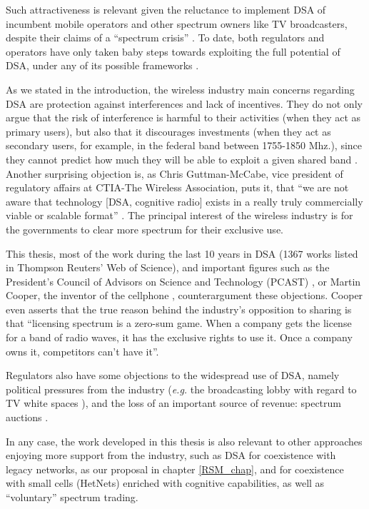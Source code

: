 Such attractiveness is relevant given the reluctance to implement DSA of incumbent mobile operators and other spectrum owners like TV broadcasters, despite their claims of a \enquote{spectrum crisis} \cite{Chen2012b}. To date, both regulators and operators have only taken baby steps towards exploiting the full potential of DSA, under any of its possible frameworks \cite{Nuechterlein2013, Kelly2012}.

As we stated in the introduction, the wireless industry main concerns regarding DSA are protection against interferences and lack of incentives. They do not only argue that the risk of interference is harmful to their activities (when they act as primary users), but also that it discourages investments (when they act as secondary users, for example, in the federal band between 1755-1850 Mhz.), since they cannot predict how much they will be able to exploit a given shared band \cite{CTIA2011}.  Another surprising objection is, as Chris Guttman-McCabe, vice president of regulatory affairs at CTIA-The Wireless Association, puts it, that \enquote{we are not aware that technology [DSA, cognitive radio] exists in a really truly commercially viable or scalable format} \cite{Chen2012}. The principal interest of the wireless industry is for the governments to clear more spectrum for their exclusive use\cite{Roche2015,Chen2012}. 

This thesis, most of the work during the last 10 years in DSA (1367 works listed in Thompson Reuters' Web of Science), and important figures such as the President’s Council of Advisors on Science and Technology (PCAST) \cite{AdvisorsonScience}, or Martin Cooper, the inventor of the cellphone \cite{Chen2012b,Br2012}, counterargument these objections. Cooper even asserts that the true reason behind the industry's opposition to sharing is that \enquote{licensing spectrum is a zero-sum game. When a company gets the license for a band of radio waves, it has the exclusive rights to use it. Once a company owns it, competitors can't have it}.

Regulators also have some objections to the widespread use of DSA, namely political pressures from the industry (\textit{e.g.} the broadcasting lobby with regard to TV white spaces \cite[p. 103]{Nuechterlein2013}), and the loss of an important source of revenue: spectrum auctions \cite{Baker2015}.

In any case, the work developed in this thesis is also relevant to other  approaches enjoying more support from the industry, such as DSA for coexistence with legacy networks, as our proposal in chapter \ref{RSM_chap}, and for coexistence with small cells (HetNets) enriched with cognitive capabilities, as well as \enquote{voluntary} spectrum trading. 

